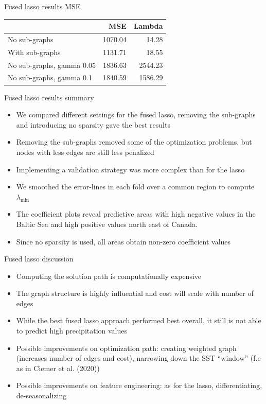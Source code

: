 \documentclass[
  ignorenonframetext,
]{beamer}
\providecommand{\tightlist}{%
  \setlength{\itemsep}{0pt}\setlength{\parskip}{0pt}}
\begin{document}
\begin{frame}{Fused lasso results MSE}
\protect\hypertarget{fused-lasso-results-mse}{}
\begin{longtable}[]{@{}lrr@{}}
\toprule()
& MSE & Lambda \\
\midrule()
\endhead
No sub-graphs & 1070.04 & 14.28 \\
With sub-graphs & 1131.71 & 18.55 \\
No sub-graphs, gamma 0.05 & 1836.63 & 2544.23 \\
No sub-graphs, gamma 0.1 & 1840.59 & 1586.29 \\
\bottomrule()
\end{longtable}
\end{frame}

\begin{frame}{Fused lasso results summary}
\protect\hypertarget{fused-lasso-results-summary}{}
\begin{itemize}
\tightlist
\item
  We compared different settings for the fused lasso, removing the
  sub-graphs and introducing no sparsity gave the best results
\item
  Removing the sub-graphs removed some of the optimization problems, but
  nodes with less edges are still less penalized
\item
  Implementing a validation strategy was more complex than for the lasso
\item
  We smoothed the error-lines in each fold over a common region to
  compute \(\lambda_{\min}\)
\item
  The coefficient plots reveal predictive areas with high negative
  values in the Baltic Sea and high positive values north east of
  Canada.
\item
  Since no sparsity is used, all areas obtain non-zero coefficient
  values
\end{itemize}
\end{frame}

\begin{frame}{Fused lasso discussion}
\protect\hypertarget{fused-lasso-discussion}{}
\begin{itemize}
\tightlist
\item
  Computing the solution path is computationally expensive
\item
  The graph structure is highly influential and cost will scale with
  number of edges
\item
  While the best fused lasso approach performed best overall, it still
  is not able to predict high precipitation values
\item
  Possible improvements on optimization path: creating weighted graph
  (increases number of edges and cost), narrowing down the SST
  ``window'' (f.e as in Ciemer et al. (2020))
\item
  Possible improvements on feature engineering: as for the lasso,
  differentiating, de-seasonalizing
\end{itemize}
\end{frame}
\end{document}
